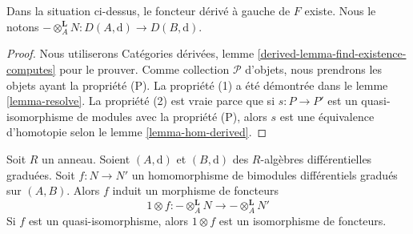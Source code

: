 \begin{lemma}
\label{lemma-derived-bc}
Dans la situation ci-dessus, le foncteur dérivé à gauche de $F$
existe. Nous le
notons $- \otimes_A^\mathbf{L} N : D(A, \text{d}) \to D(B, \text{d})$.
\end{lemma}

\begin{proof}
Nous
utiliserons Catégories dérivées, lemme \ref{derived-lemma-find-existence-computes} pour
le prouver. Comme collection $\mathcal{P}$ d'objets,
nous prendrons les objets ayant la propriété (P). La propriété
(1) a été démontrée dans le lemme \ref{lemma-resolve}. La
propriété (2) est vraie parce que si $s : P \to P'$ est un quasi-isomorphisme de
modules avec la propriété (P), alors $s$ est une équivalence d'homotopie selon
le lemme \ref{lemma-hom-derived}.
\end{proof}

\begin{lemma}
\label{lemma-functoriality-bc}
Soit $R$ un anneau. Soient $(A, \text{d})$ et $(B, \text{d})$ des
$R$-algèbres différentielles graduées. Soit $f : N \to N'$ un
homomorphisme de bimodules différentiels gradués sur $(A, B)$.
Alors $f$ induit un morphisme de foncteurs
$$
1\otimes f :
- \otimes_A^\mathbf{L} N
\longrightarrow -
\otimes_A^\mathbf{L} N'
$$
Si $f$ est un quasi-isomorphisme, alors $1 \otimes f$ est un isomorphisme de
foncteurs.
\end{lemma}

